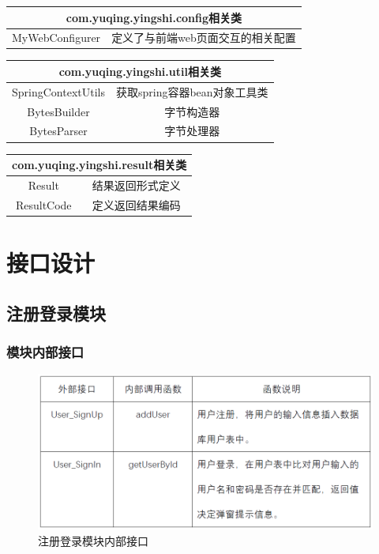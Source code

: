\begin{tabular}{|c|c|} 
\hline 
\multicolumn{2}{|c|}{com.yuqing.yingshi.config相关类} \\ 
\hline 
MyWebConfigurer& 定义了与前端web页面交互的相关配置\\
\hline 
\end{tabular}

\begin{tabular}{|c|c|} 
\hline 
\multicolumn{2}{|c|}{com.yuqing.yingshi.util相关类} \\ 
\hline 
SpringContextUtils&获取spring容器bean对象工具类\\
BytesBuilder&字节构造器\\
BytesParser&字节处理器\\
\hline 
\end{tabular}

\begin{tabular}{|c|c|} 
\hline 
\multicolumn{2}{|c|}{com.yuqing.yingshi.result相关类} \\ 
\hline 
Result&结果返回形式定义\\
ResultCode&定义返回结果编码\\
\hline 
\end{tabular}


\section{接口设计}
\subsection{注册登录模块}
\subsubsection{模块内部接口}
\begin{figure}[!htbp]
	\centering
	\includegraphics[scale=0.7]{image/b1.png} %
	\caption{注册登录模块内部接口} %
\end{figure}

